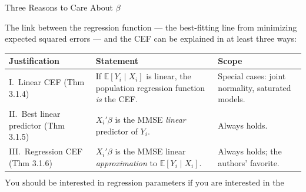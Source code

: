 \documentclass[aspectratio=169,11pt]{beamer}
\newcommand{\E}{\mathbb{E}}
\begin{document}
\begin{frame}{Three Reasons to Care About $\beta$}
\small

The link between the regression function --- the best-fitting line from
minimizing expected squared errors --- and the CEF can be explained in at
least three ways:

\medskip

\begin{center}
\renewcommand{\arraystretch}{1.35}
\begin{tabular}{@{}B{3.6cm}L{5.7cm}L{4.6cm}@{}}
\toprule
Justification & Statement & Scope \\
\midrule
I.\ Linear CEF \newline (Thm 3.1.4)
  & If $\E[Y_i\mid X_i]$ is linear, the population regression function
    \emph{is} the CEF.
  & Special cases: joint normality, saturated models. \\
II.\ Best linear predictor \newline (Thm 3.1.5)
  & $X_i'\beta$ is the MMSE \emph{linear} predictor of $Y_i$.
  & Always holds. \\
III.\ Regression CEF \newline (Thm 3.1.6)
  & $X_i'\beta$ is the MMSE linear \emph{approximation} to
    $\E[Y_i\mid X_i]$.
  & Always holds; the authors' favorite. \\
\bottomrule
\end{tabular}
\end{center}

\medskip

\[
\boxed{
\text{You should be interested in regression parameters if you are
interested in the CEF.}
}
\]

\end{frame}
\end{document}
